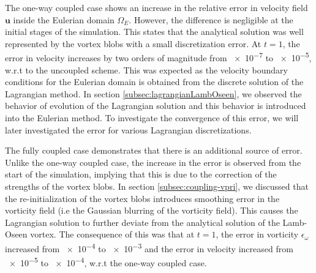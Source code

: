 The one-way coupled case shows an increase in the relative error in velocity field $\mathbf{u}$ inside the Eulerian domain $\Omega_E$. However, the difference is negligible at the initial stages of the simulation. This states that the analytical solution was well represented by the vortex blobs with a small discretization error. At $t=1$, the error in velocity increases by two orders of magnitude from \num{e-7} to \num{e-5}, w.r.t to the uncoupled scheme. This was expected as the velocity boundary conditions for the Eulerian domain is obtained from the discrete solution of the Lagrangian method. In section \ref{subsec:lagrangianLambOseen}, we observed the behavior of evolution of the Lagrangian solution and this behavior is introduced into the Eulerian method. To investigate the convergence of this error, we will later investigated the error for various Lagrangian discretizations.

The fully coupled case demonstrates that there is an additional source of error. Unlike the one-way coupled case, the increase in the error is observed from the start of the simulation, implying that this is due to the correction of the strengths of the vortex blobs. In section \ref{subsec:coupling-vpri}, we discussed that the re-initialization of the vortex blobs introduces smoothing error in the vorticity field (i.e the Gaussian blurring of the vorticity field). This causes the Lagrangian solution to further deviate from the analytical solution of the Lamb-Oseen vortex. The consequence of this was that at $t=1$, the error in vorticity $\epsilon_{\omega}$ increased from \num{e-4} to \num{e-3} and the error in velocity increased from \num{e-5} to \num{e-4}, w.r.t the one-way coupled case.


